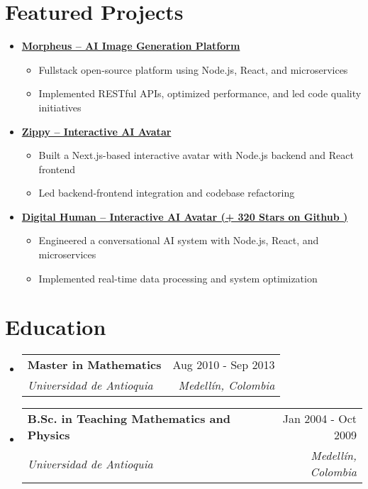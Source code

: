 \documentclass[letterpaper,11pt]{article}
\makeatletter
\newcommand{\resumeSubheading}[4]{
  \vspace{-2pt}
  \item[]
  \begin{tabular*}{\textwidth}{@{\extracolsep{\fill}}l r}
    \textbf{#1} & #2 \\
    \textit{#3} & \textit{#4} \\
  \end{tabular*}
  \vspace{-5pt}
}
\newcommand{\normalfaExternalLink}{{\mdseries\faExternalLink}}
\makeatother
\begin{document}
\section{Featured Projects}
\begin{itemize}[leftmargin=*]
    \item \textbf{\href{https://github.com/Monadical-SAS/Morpheus}{Morpheus -- AI Image Generation Platform \normalfaExternalLink}}
    \begin{itemize}
        \item Fullstack open-source platform using Node.js, React, and microservices
        \item Implemented RESTful APIs, optimized performance, and led code quality initiatives
    \end{itemize}
    \item \textbf{\href{https://github.com/asanchezyali/ai-avatar}{Zippy -- Interactive AI Avatar \normalfaExternalLink}}
    \begin{itemize}
        \item Built a Next.js-based interactive avatar with Node.js backend and React frontend
        \item Led backend-frontend integration and codebase refactoring
    \end{itemize}
        \item \textbf{\href{https://github.com/asanchezyali/talking-avatar-with-ai}{Digital Human -- Interactive AI Avatar (+
        320 Stars on Github )\normalfaExternalLink}}
    \begin{itemize}
        \item Engineered a conversational AI system with Node.js, React, and microservices
        \item Implemented real-time data processing and system optimization
    \end{itemize}
\end{itemize}

\section{Education}
\begin{itemize}[leftmargin=0pt, itemindent=0pt, label={}]
\resumeSubheading
{Master in Mathematics}{Aug 2010 - Sep 2013}
{Universidad de Antioquia}{Medellín, Colombia}

\resumeSubheading
{B.Sc. in Teaching Mathematics and Physics}{Jan 2004 - Oct 2009}
{Universidad de Antioquia}{Medellín, Colombia}
\end{itemize}
\end{document}
